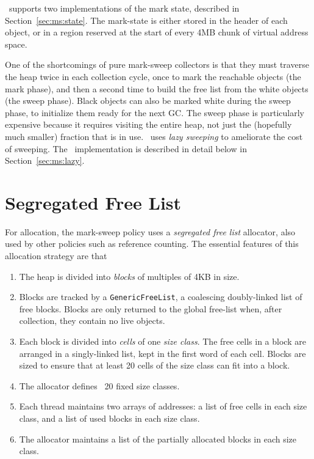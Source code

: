 \mmtk\ supports two implementations of the mark state, described in
Section~\ref{sec:ms:state}.  The mark-state is either stored in the header
of each object, or in a region reserved at the start of every 4MB chunk of
virtual address space.

One of the shortcomings of pure mark-sweep collectors is that they must traverse
the heap twice in each collection cycle, once to mark the reachable objects
(the mark phase), and then a second time to build the free list from the white
objects (the sweep phase).  
Black objects can also be marked white during the sweep phase, 
to initialize them ready for the next GC.
The sweep phase is particularly expensive because it requires visiting the
entire heap, not just the (hopefully much smaller) fraction that is in use.
\mmtk\ uses \emph{lazy sweeping} \citep{Hughes:82, Boehm:00} to ameliorate the
cost of sweeping.  The \mmtk\ implementation is described in detail below in
Section~\ref{sec:ms:lazy}.

\section{Segregated Free List}

For allocation, the mark-sweep policy uses a \emph{segregated free list}
allocator, also used by other policies such as reference counting.
The essential features of this allocation strategy are that 
\begin{enumerate}
  \item The heap is divided into \emph{blocks} of multiples of 4KB in size.
  \item Blocks are tracked by a \lstinline|GenericFreeList|, a coalescing
  doubly-linked list of free blocks.  Blocks are only returned to the global
  free-list when, after collection, they contain no live objects.
  \item Each block is divided into \emph{cells} of one \emph{size class}.  The
  free cells in a block are arranged in a singly-linked list, kept in the first
  word of each cell.  Blocks are sized to ensure that at least 20 cells of the
  size class can fit into a block.
  \item The allocator defines ~20 fixed size classes.  
  \item Each thread maintains two arrays of addresses: a list of free cells in
  each size class, and a list of used blocks in each size class.
  \item The allocator maintains a list of the partially allocated blocks in each
  size class.
\end{enumerate}

